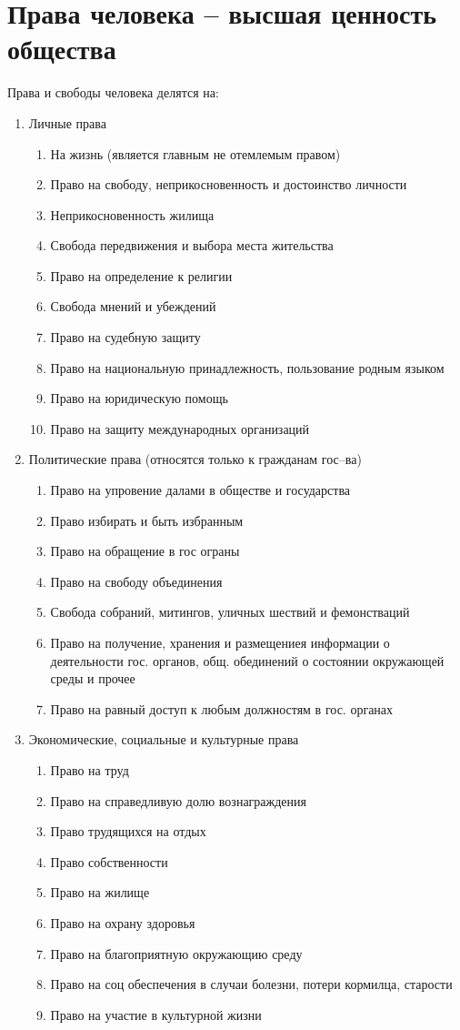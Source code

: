 \documentclass[14pt]{extarticle}
\begin{document}
	\section{Права человека -- высшая ценность общества}
	Права и свободы человека делятся на:
	\begin{enumerate}
		\item Личные права
		\begin{enumerate}
			\item На жизнь (является главным не отемлемым правом)
			\item Право на свободу, неприкосновенность и достоинство личности
			\item Неприкосновенность жилища
			\item Свобода передвижения и выбора места жительства
			\item Право на определение к религии
			\item Свобода мнений и убеждений
			\item Право на судебную защиту
			\item Право на национальную принадлежность, пользование родным языком
			\item Право на юридическую помощь
			\item Право на защиту международных организаций
		\end{enumerate}
		\item Политические права (относятся только к гражданам гос--ва)
		\begin{enumerate}
			\item Право на упровение далами в обществе и государства
			\item Право избирать и быть избранным
			\item Право на обращение в гос ограны
			\item Право на свободу объединения
			\item Свобода собраний, митингов, уличных шествий и фемонстваций
			\item Право на получение, хранения и размещениея информации о деятельности гос. органов, общ. обединений о состоянии окружающей среды и прочее
			\item Право на равный доступ к любым должностям в гос. органах
		\end{enumerate}
		\item Экономические, социальные и культурные права
		\begin{enumerate}
			\item Право на труд
			\item Право на справедливую долю вознаграждения 
			\item Право трудящихся на отдых
			\item Право собственности
			\item Право на жилище 
			\item Право на охрану здоровья
			\item Право на благоприятную окружающию среду
			\item Право на соц обеспечения в случаи болезни, потери кормилца, старости
			\item Право на участие в культурной жизни
		\end{enumerate}
	\end{enumerate}
\end{document}
